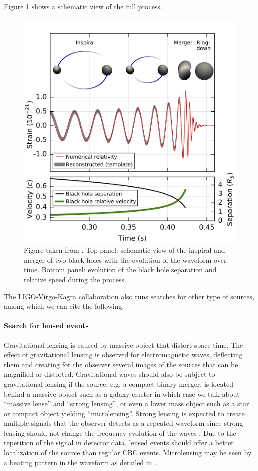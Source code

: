 Figure \ref{fig:inspiral} shows a schematic view of the full process.
%
\begin{figure}
  \centering
  \includegraphics[width=0.5\linewidth]{sectionGW/inspiral.png}
  \caption{Figure taken from \cite{gw150914}. Top panel: schematic view of the inspiral and merger of two black holes with the evolution of the waveform over time. Bottom panel: evolution of the black hole separation and relative speed during the process.}
  \label{fig:inspiral}
\end{figure}
%

The LIGO-Virgo-Kagra collaboration also runs searches for other type of sources, among which we can cite the following:

\paragraph*{Search for lensed events}
Gravitational lensing is caused by massive object that distort space-time.
The effect of gravitational lensing is observed for electromagnetic waves, deflecting them and creating for the observer several images of the sources that can be magnified or distorted.
Gravitational waves should also be subject to gravitational lensing if the source, e.g. a compact binary merger, is located behind a massive object such as a galaxy cluster in which case we talk about ``massive lense'' and ``strong lensing'', or even a lower mass object such as a star or compact object yielding ``microlensing''.
Strong lensing is expected to create multiple signals that the observer detects as a repeated waveform since strong lensing should not change the frequency evolution of the waves \cite{LVK_lensing}.
Due to the repetition of the signal in detector data, lensed events should offer a better localization of the source than regular CBC events.
Microlensing may be seen by a beating pattern in the waveform as detailed in \cite{lensing_beating}.


